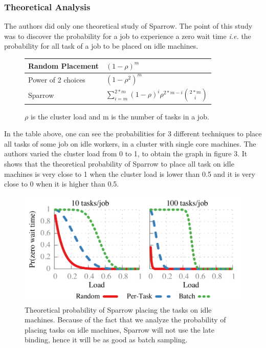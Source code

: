 \documentclass[11pt]{article}
\begin{document}
		\subsubsection*{Theoretical Analysis}
			\label{theoreticalanalysis}
        
        	The authors did only one theoretical study of Sparrow. The point of this study was to discover the probability for a job to experience a zero wait time \textit{i.e.} the probability for all task of a job to be placed on idle machines.
            
            \begin{figure}[H]
            	\centering
                \begin{tabular}{ | l | l |}
                    \hline
                    Random Placement & $(1-\rho)^m$  \\ \hline
                    Power of 2 choices & $(1-\rho^2)^m$  \\ \hline
                    Sparrow & $\sum_{i=m}^{2*m}(1-\rho)^i$$\rho^{2*m-i}$${2*m}\choose{i}$ \\
                    \hline
                \end{tabular}
                \caption{$\rho$ is the cluster load and m is the number of tasks in a job.}
        	\end{figure}
            
            In the table above, one can see the probabilities for 3 different techniques to place all tasks of some job on idle workers, in a cluster with single core machines. The authors varied the cluster load from 0 to 1, to obtain the graph in figure 3. It shows that the theoretical probability of Sparrow to place all task on idle machines is very close to 1 when the cluster load is lower than 0.5 and it is very close to 0 when it is higher than 0.5.
            
            \begin{figure}
            	\includegraphics[scale=.3]{fig3}
            	\caption{Theoretical probability of Sparrow placing the tasks on idle machines. Because of the fact that we analyze the probability of placing tasks on idle machines, Sparrow will not use the late binding, hence it will be as good as batch sampling.}
            	\label{fig3}
            \end{figure}
         
\end{document}
